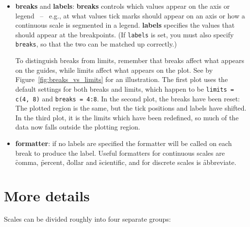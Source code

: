 \begin{itemize}
  \item {\bf breaks} and {\bf labels}: {\bf breaks} controls which values appear on the axis or legend ~--~ e.g., at what values tick marks should appear on an axis or how a continuous scale is segmented in a legend.  {\bf labels} specifies the values that should appear at the breakpoints. (If {\tt labels} is set, you must also specify {\tt breaks}, so that the two can be matched up correctly.)  

  To distinguish breaks from limits, remember that breaks affect what appears on the guides, while limits affect what appears on the plot.  See by Figure~\ref{fig:breaks_vs_limits} for an illustration.  The first plot uses the default settings for both breaks and limits, which happen to be {\tt limits = c(4, 8)} and {\tt breaks = 4:8}.  In the second plot, the breaks have been reset: The plotted region is the same, but the tick positions and labels have shifted.  In the third plot, it is the limits which have been redefined, so much of the data now falls outside the plotting region. 
  

  \item {\bf formatter}: if no labels are specified the formatter will be called on each break to produce the label.  Useful formatters for continuous scales are \f{comma}, \f{percent}, \f{dollar} and \f{scientific}, and for discrete scales is \f{abbreviate}.
\end{itemize}

\section{More details}
\label{sec:more-details}

Scales can be divided roughly into four separate groups:

